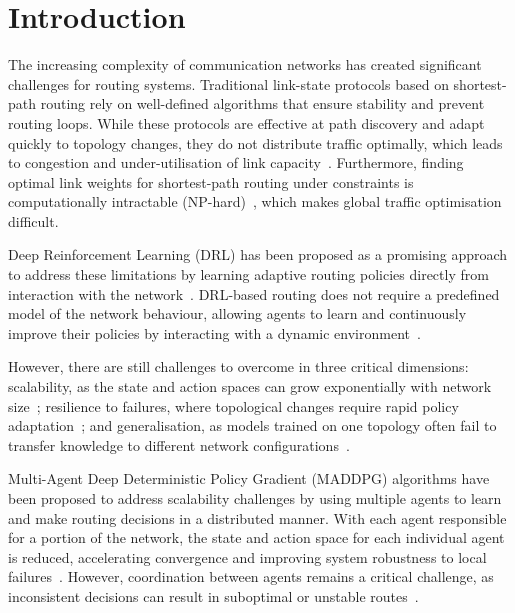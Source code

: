 \documentclass[10pt,journal,comsoc]{IEEEtran}
\begin{document}
\section{Introduction}
The increasing complexity of communication networks has created significant challenges for routing systems. Traditional link-state protocols based on shortest-path routing rely on well-defined algorithms that ensure stability and prevent routing loops. While these protocols are effective at path discovery and adapt quickly to topology changes, they do not distribute traffic optimally, which leads to congestion and under-utilisation of link capacity~\cite{he2023routing,xiao2021leveraging}. Furthermore, finding optimal link weights for shortest-path routing under constraints is computationally intractable (NP-hard)~\cite{kodialam2022network}, which makes global traffic optimisation difficult.

Deep Reinforcement Learning (DRL) has been proposed as a promising approach to address these limitations by learning adaptive routing policies directly from interaction with the network~\cite{abrol2024deep}. DRL-based routing does not require a predefined model of the network behaviour, allowing agents to learn and continuously improve their policies by interacting with a dynamic environment~\cite{he2023routing,casas2020intelligent}.

However, there are still challenges to overcome in three critical dimensions: scalability, as the state and action spaces can grow exponentially with network size~\cite{xiao2021leveraging,liu2023scalable}; resilience to failures, where topological changes require rapid policy adaptation~\cite{liu2023scalable,rao2024dar,bhavanasi2022routing}; and generalisation, as models trained on one topology often fail to transfer knowledge to different network configurations~\cite{he2023routing,bhavanasi2022routing}.

Multi-Agent Deep Deterministic Policy Gradient (MADDPG) algorithms have been proposed to address scalability challenges by using multiple agents to learn and make routing decisions in a distributed manner. With each agent responsible for a portion of the network, the state and action space for each individual agent is reduced, accelerating convergence and improving system robustness to local failures~\cite{bhavanasi2022routing,geng2020multi,li2022applications}. However, coordination between agents remains a critical challenge, as inconsistent decisions can result in suboptimal or unstable routes~\cite{feriani2021single,ding2024multi}.
\end{document}
